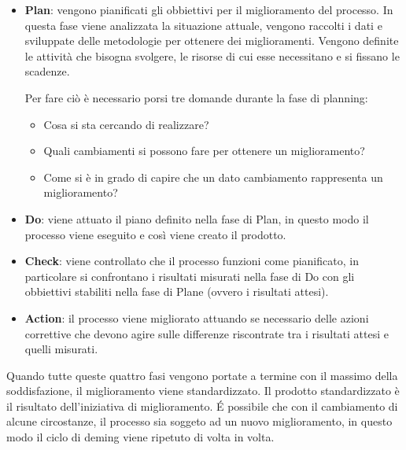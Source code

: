 \begin{itemize}
	\item \textbf{Plan}: vengono pianificati gli obbiettivi per il miglioramento del processo. In questa fase viene analizzata la situazione attuale, vengono raccolti i dati e sviluppate delle metodologie per ottenere dei miglioramenti. Vengono definite le attività che bisogna svolgere, le risorse di cui esse necessitano e si fissano le scadenze.
	
	Per fare ciò è necessario porsi tre domande durante la fase di planning:
	\begin{itemize}
		\item Cosa si sta cercando di realizzare?
		\item Quali cambiamenti si possono fare per ottenere un miglioramento?
		\item Come si è in grado di capire che un dato cambiamento rappresenta un miglioramento?
	\end{itemize}

	\item \textbf{Do}: viene attuato il piano definito nella fase di Plan, in questo modo il processo viene eseguito e così viene creato il prodotto.
	
	\item \textbf{Check}: viene controllato che il processo funzioni come pianificato, in particolare si confrontano i risultati misurati nella fase di Do con gli obbiettivi stabiliti nella fase di Plane (ovvero i risultati attesi).
	
	\item \textbf{Action}: il processo viene migliorato attuando se necessario delle azioni correttive che devono agire sulle differenze riscontrate tra i risultati attesi e quelli misurati.
\end{itemize}

Quando tutte queste quattro fasi vengono portate a termine con il massimo della soddisfazione, il miglioramento viene standardizzato. Il prodotto standardizzato è il risultato dell'iniziativa di miglioramento. É possibile che con il cambiamento di alcune circostanze, il processo sia soggeto ad un nuovo miglioramento, in questo modo il ciclo di deming viene ripetuto di volta in volta.